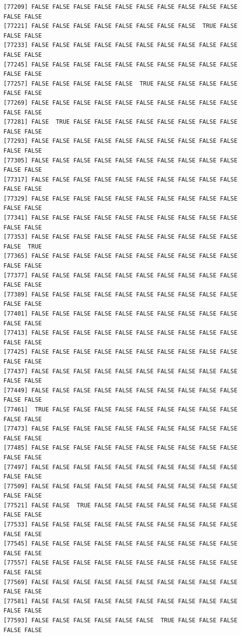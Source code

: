 \documentclass[
  a4paper,
  DIV=11,
  numbers=noendperiod]{scrartcl}
\begin{document}
\begin{verbatim}
[77209] FALSE FALSE FALSE FALSE FALSE FALSE FALSE FALSE FALSE FALSE FALSE FALSE
[77221] FALSE FALSE FALSE FALSE FALSE FALSE FALSE FALSE  TRUE FALSE FALSE FALSE
[77233] FALSE FALSE FALSE FALSE FALSE FALSE FALSE FALSE FALSE FALSE FALSE FALSE
[77245] FALSE FALSE FALSE FALSE FALSE FALSE FALSE FALSE FALSE FALSE FALSE FALSE
[77257] FALSE FALSE FALSE FALSE FALSE  TRUE FALSE FALSE FALSE FALSE FALSE FALSE
[77269] FALSE FALSE FALSE FALSE FALSE FALSE FALSE FALSE FALSE FALSE FALSE FALSE
[77281] FALSE  TRUE FALSE FALSE FALSE FALSE FALSE FALSE FALSE FALSE FALSE FALSE
[77293] FALSE FALSE FALSE FALSE FALSE FALSE FALSE FALSE FALSE FALSE FALSE FALSE
[77305] FALSE FALSE FALSE FALSE FALSE FALSE FALSE FALSE FALSE FALSE FALSE FALSE
[77317] FALSE FALSE FALSE FALSE FALSE FALSE FALSE FALSE FALSE FALSE FALSE FALSE
[77329] FALSE FALSE FALSE FALSE FALSE FALSE FALSE FALSE FALSE FALSE FALSE FALSE
[77341] FALSE FALSE FALSE FALSE FALSE FALSE FALSE FALSE FALSE FALSE FALSE FALSE
[77353] FALSE FALSE FALSE FALSE FALSE FALSE FALSE FALSE FALSE FALSE FALSE  TRUE
[77365] FALSE FALSE FALSE FALSE FALSE FALSE FALSE FALSE FALSE FALSE FALSE FALSE
[77377] FALSE FALSE FALSE FALSE FALSE FALSE FALSE FALSE FALSE FALSE FALSE FALSE
[77389] FALSE FALSE FALSE FALSE FALSE FALSE FALSE FALSE FALSE FALSE FALSE FALSE
[77401] FALSE FALSE FALSE FALSE FALSE FALSE FALSE FALSE FALSE FALSE FALSE FALSE
[77413] FALSE FALSE FALSE FALSE FALSE FALSE FALSE FALSE FALSE FALSE FALSE FALSE
[77425] FALSE FALSE FALSE FALSE FALSE FALSE FALSE FALSE FALSE FALSE FALSE FALSE
[77437] FALSE FALSE FALSE FALSE FALSE FALSE FALSE FALSE FALSE FALSE FALSE FALSE
[77449] FALSE FALSE FALSE FALSE FALSE FALSE FALSE FALSE FALSE FALSE FALSE FALSE
[77461]  TRUE FALSE FALSE FALSE FALSE FALSE FALSE FALSE FALSE FALSE FALSE FALSE
[77473] FALSE FALSE FALSE FALSE FALSE FALSE FALSE FALSE FALSE FALSE FALSE FALSE
[77485] FALSE FALSE FALSE FALSE FALSE FALSE FALSE FALSE FALSE FALSE FALSE FALSE
[77497] FALSE FALSE FALSE FALSE FALSE FALSE FALSE FALSE FALSE FALSE FALSE FALSE
[77509] FALSE FALSE FALSE FALSE FALSE FALSE FALSE FALSE FALSE FALSE FALSE FALSE
[77521] FALSE FALSE  TRUE FALSE FALSE FALSE FALSE FALSE FALSE FALSE FALSE FALSE
[77533] FALSE FALSE FALSE FALSE FALSE FALSE FALSE FALSE FALSE FALSE FALSE FALSE
[77545] FALSE FALSE FALSE FALSE FALSE FALSE FALSE FALSE FALSE FALSE FALSE FALSE
[77557] FALSE FALSE FALSE FALSE FALSE FALSE FALSE FALSE FALSE FALSE FALSE FALSE
[77569] FALSE FALSE FALSE FALSE FALSE FALSE FALSE FALSE FALSE FALSE FALSE FALSE
[77581] FALSE FALSE FALSE FALSE FALSE FALSE FALSE FALSE FALSE FALSE FALSE FALSE
[77593] FALSE FALSE FALSE FALSE FALSE FALSE  TRUE FALSE FALSE FALSE FALSE FALSE

\end{verbatim}
\end{document}

